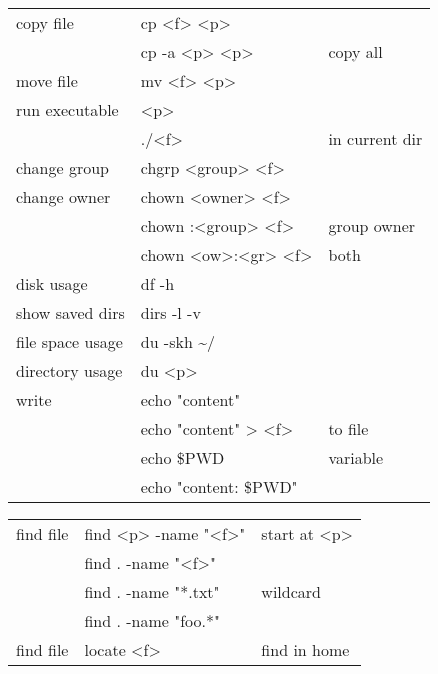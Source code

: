 {\begin{tabularx}{\linewidth}{@{} l>{\ttfamily}lX @{}}
    copy file            & cp <f> <p>                 &                 \\
                         & cp -a <p> <p>              & copy all        \\
    move file            & mv <f> <p>                 &                 \\
    run executable       & <p>                        &                 \\
                         & ./<f>                      & in current dir  \\
    change group         & chgrp <group> <f>          &                 \\
    change owner         & chown <owner> <f>          &                 \\
                         & chown :<group> <f>         & group owner     \\
                         & chown <ow>:<gr> <f>        & both            \\
    disk usage           & df -h                      &                 \\
    show saved dirs      & dirs -l -v                 &                 \\
    file space usage     & du -skh \textasciitilde{}/ &                 \\
    directory usage      & du <p>                     &                 \\
    write                & echo "content"             &                 \\
                         & echo "content" > <f>       & to file         \\
                         & echo \$PWD                 & variable        \\
                         & echo "content: \$PWD"      &                 \\
\end{tabularx}
\begin{tabularx}{\linewidth}{@{} l>{\ttfamily}lX @{}}
    find file          & find <p> -name "<f>"  & start at <p>                 \\
                       & find . -name "<f>"    &                              \\
                       & find . -name "*.txt"  & wildcard                     \\
                       & find . -name "foo.*"  &                              \\
    find file          & locate <f>            & find in home                 \\

\end{tabularx}}

